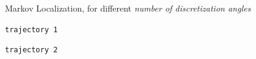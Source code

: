 \documentclass[letterpaper, 10pt, conference]{ieeeconf}
\begin{document}
\begin{figure}

\begin{center}
Markov Localization, for different \emph{number of discretization angles}
\end{center}
\begin{minipage}{3.3in}
\begin{center}
\texttt{trajectory~1}
\end{center}
\end{minipage}
\hfill
\begin{minipage}{3.3in}
\begin{center}
\texttt{trajectory~2}
\end{center}
\end{minipage}

\vspace{.3em}


\end{figure}
\end{document}
